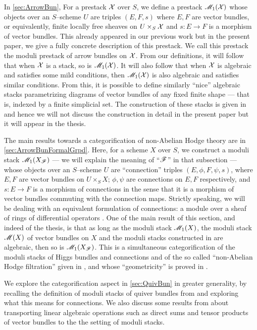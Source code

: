 \documentclass[11pt]{amsart}
\begin{document}
In \cref{sec:ArrowBun}, For a prestack $\mathcal{X}$
over $S$, we define a prestack $\mathscr{M}_1(\mathcal{X})$ whose objects over an $S$--scheme
$U$ are triples $(E, F, s)$ where $E, F$ are vector bundles, or equivalently,
finite locally free sheaves on $U \times_S \mathcal{X}$ and $s : E \to F$ is a morphism
of vector bundles. This already appeared in our previous work
\cite{ModQuivBun} but in the present paper, we give a fully concrete description
of this prestack. We call this prestack the moduli prestack of arrow bundles
on $\mathcal{X}$. From our definitions, it will follow that when $\mathcal{X}$ is
a stack, so is $\mathscr{M}_1(\mathcal{X})$. It will also follow that when $\mathcal{X}$ is
algebraic and satisfies some mild conditions, then $\mathscr{M}_1(\mathcal{X})$ is also
algebraic and satisfies similar conditions. From this, it is possible
to define similarly ``nice'' algebraic stacks parametrizing diagrams
of vector bundles of any fixed finite shape --- that is, indexed by a finite
simplicial set. The construction of these stacks is given in \cite{ModQuivBun}
and hence we will not discuss the construction in detail in the present paper
but it will appear in the thesis.

The main results towards a categorification of non-Abelian Hodge theory are in
\cref{sec:ArrowBunFormalGrpd}. Here, for a scheme $X$ over $S$, we construct a
moduli stack $\mathscr{M}_1(X_\mathscr{F})$ --- we will explain the meaning of ``$\mathscr{F}$'' in that
subsection --- whose objects over an $S$--scheme $U$ are
``connection'' triples $(E, \phi, F, \psi, s)$, where $E, F$ are
vector bundles on $U \times_S X$; $\phi, \psi$ are connections on $E, F$
respectively, and $s : E \to F$ is a morphism of connections in the sense that
it is a morphism of vector bundles commuting with the connection maps.
Strictly speaking, we will be dealing with an equivalent formulation of
connections: a module over a sheaf of rings of differential operators
\cite[\S 2]{ModRepFunGrpI}.
One of the main result of this section, and
indeed of the thesis, is that as long as the moduli stack $\mathscr{M}_1(X)$, the
moduli stack $\mathscr{M}(X)$ of vector bundles on $X$ and the moduli stacks constructed
in \cite[31---33]{NonAbHodgeFilt} are algebraic, then so is $\mathscr{M}_1(X_\mathscr{F})$.
This is a simultaneous categorification of the moduli stacks of Higgs bundles
and connections and of the so called ``non-Abelian Hodge filtration'' given in
\cite[31---33]{NonAbHodgeFilt}, and whose ``geometricity'' is proved in
\cite[Theorem 6.13]{GeomNonAbHodgeFilt}.

We explore the categorification aspect in \cref{sec:QuivBun} in greater
generality, by recalling the definition of moduli stacks of quiver bundles from
\cite{ModQuivBun} and exploring what this means for connections.
We also discuss some results from \cite{ModQuivBun} about
transporting linear algebraic operations such as direct sums and tensor
products of vector bundles to the the setting of moduli stacks.
\end{document}

